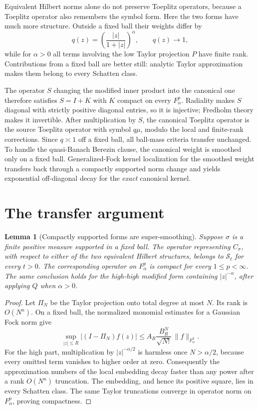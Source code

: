 \documentclass[11pt]{article}
\newtheorem{lemma}[theorem]{Lemma}
\newcommand{\Fc}[2]{F^{#1}_{#2}}
\newcommand{\Sc}{\mathcal S}
\begin{document}
Equivalent Hilbert norms alone do not preserve Toeplitz operators, because a
Toeplitz operator also remembers the symbol form.  Here the two forms have much
more structure.  Outside a fixed ball their weights differ by
\[
 q(z)=\left(\frac{|z|}{1+|z|}\right)^\alpha,
 \qquad q(z)\longrightarrow1,
\]
while for \(\alpha>0\) all terms involving the low Taylor projection \(P\)
have finite rank.  Contributions from a fixed ball are better still: analytic
Taylor approximation makes them belong to every Schatten class.

The operator \(S\) changing the modified inner product into the canonical one
therefore satisfies \(S=I+K\) with \(K\) compact on every \(\Fc p\alpha\).
Radiality makes \(S\) diagonal with strictly positive diagonal entries, so it
is injective; Fredholm theory makes it invertible.  After multiplication by
\(S\), the canonical Toeplitz operator is the source Toeplitz operator with
symbol \(q\mu\), modulo the local and finite-rank corrections.  Since
\(q\asymp1\) off a fixed ball, all ball-mass criteria transfer unchanged.
To handle the quasi-Banach Berezin clause, the canonical weight is smoothed
only on a fixed ball.  Generalized-Fock kernel localization for the smoothed
weight transfers back through a compactly supported norm change and yields
exponential off-diagonal decay for the \emph{exact} canonical kernel.

\section{The transfer argument}

\begin{lemma}[Compactly supported forms are super-smoothing]\label{lem:local}
Suppose \(\sigma\) is a finite positive measure supported in a fixed ball.
The operator representing \(C_\sigma\), with respect to either of the two
equivalent Hilbert structures, belongs to \(\Sc_t\) for every \(t>0\).
The corresponding operator on \(\Fc p\alpha\) is compact for every
\(1\leq p<\infty\).  The same conclusion holds for the high-high modified
form containing \(|z|^{-\alpha}\), after applying \(Q\) when \(\alpha>0\).
\end{lemma}

\begin{proof}
Let \(\Pi_N\) be the Taylor projection onto total degree at most \(N\).  Its
rank is \(O(N^n)\).  On a fixed ball, the normalized monomial estimates for a
Gaussian Fock norm give
\[
 \sup_{|z|\leq R}|(I-\Pi_N)f(z)|
 \leq A_R\frac{B_R^N}{\sqrt{N!}}\,\|f\|_{\Fc2\alpha}.              \tag{4.1}
\]
For the high part, multiplication by \(|z|^{-\alpha/2}\) is harmless once
\(N>\alpha/2\), because every omitted term vanishes to higher order at zero.
Consequently the approximation numbers of the local embedding decay faster
than any power after a rank \(O(N^n)\) truncation.  The embedding, and hence
its positive square, lies in every Schatten class.  The same Taylor
truncations converge in operator norm on \(\Fc p\alpha\), proving compactness.
\end{proof}
\end{document}
